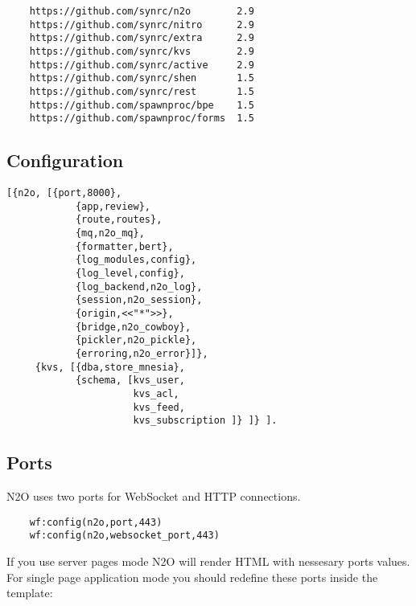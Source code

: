 \vspace{1\baselineskip}
\begin{lstlisting}
    https://github.com/synrc/n2o        2.9
    https://github.com/synrc/nitro      2.9
    https://github.com/synrc/extra      2.9
    https://github.com/synrc/kvs        2.9
    https://github.com/synrc/active     2.9
    https://github.com/synrc/shen       1.5
    https://github.com/synrc/rest       1.5
    https://github.com/spawnproc/bpe    1.5
    https://github.com/spawnproc/forms  1.5
\end{lstlisting}
\vspace{1\baselineskip}

\newpage
\subsection{Configuration}

\vspace{1\baselineskip}
\begin{lstlisting}[caption=sys.config]
    [{n2o, [{port,8000},
            {app,review},
            {route,routes},
            {mq,n2o_mq},
            {formatter,bert},
            {log_modules,config},
            {log_level,config},
            {log_backend,n2o_log},
            {session,n2o_session},
            {origin,<<"*">>},
            {bridge,n2o_cowboy},
            {pickler,n2o_pickle},
            {erroring,n2o_error}]},
     {kvs, [{dba,store_mnesia},
            {schema, [kvs_user,
                      kvs_acl,
                      kvs_feed,
                      kvs_subscription ]} ]} ].
\end{lstlisting}
\vspace{1\baselineskip}


\subsection*{Ports}
N2O uses two ports for WebSocket and HTTP connections.

\vspace{1\baselineskip}
\begin{lstlisting}
    wf:config(n2o,port,443)
    wf:config(n2o,websocket_port,443)
\end{lstlisting}
\vspace{1\baselineskip}

If you use server pages mode N2O will render HTML with nessesary ports values.
For single page application mode you should redefine these ports inside the template:

